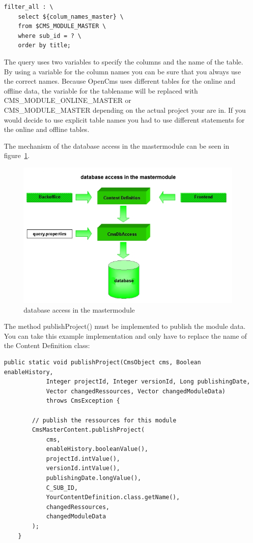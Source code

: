 \begin{verbatim}
filter_all : \
    select ${colum_names_master} \
    from $CMS_MODULE_MASTER \
    where sub_id = ? \
    order by title;
\end{verbatim}

The query uses two variables to specify the columns and the name of the table. 
By using a variable for the column names you can be sure that you always use the correct names.
Because OpenCms uses different tables for the online and offline data, the variable for the tablename
will be replaced with CMS\_MODULE\_ONLINE\_MASTER or \\
CMS\_MODULE\_MASTER depending on the actual project your are in.
If you would decide to use explicit table names you had to use different statements for the online and offline tables.

The mechanism of the database access in the mastermodule can be seen in figure~\ref{databasemaster}.

\begin{figure}
\begin{center}
\includegraphics[clip,width=\sgw]{pics/modules/masterclasses}
\end{center}
\caption[database access in the mastermodule]
    {database access in the mastermodule}
\label{databasemaster}
\end{figure}

The method {\meth publishProject()} must be implemented to publish the module data. You can take
this example implementation and only have to replace the name of the Content Definition class:

\begin{verbatim}
public static void publishProject(CmsObject cms, Boolean enableHistory,
            Integer projectId, Integer versionId, Long publishingDate,
            Vector changedRessources, Vector changedModuleData) 
            throws CmsException {

        // publish the ressources for this module
        CmsMasterContent.publishProject(
            cms, 
            enableHistory.booleanValue(),
            projectId.intValue(), 
            versionId.intValue(),
            publishingDate.longValue(), 
            C_SUB_ID, 
            YourContentDefinition.class.getName(),
            changedRessources, 
            changedModuleData
        );
    }
\end{verbatim}

